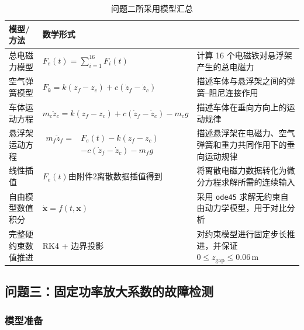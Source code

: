 \documentclass[a4paper]{nmmcm}
\begin{document}
\FloatBarrier
\begin{table}[H]
\centering
\caption{问题二所采用模型汇总}
\label{tab:problem2_model}
\small
\renewcommand{\arraystretch}{1.35}
\begin{tabularx}{\textwidth}{
>{\centering\arraybackslash}p{2.5cm}
>{\centering\arraybackslash}p{6.0cm}
>{\raggedright\arraybackslash}X}
\toprule
模型/方法 & 数学形式 & \multicolumn{1}{c}{用途说明} \\
\midrule

总电磁力模型 
& $F_e(t)=\sum_{i=1}^{16}F_i(t)$ 
& 计算 16 个电磁铁对悬浮架产生的总电磁力 \\

空气弹簧模型 
& $F_k=k(z_f-z_c)+c(\dot{z}_f-\dot{z}_c)$ 
& 描述车体与悬浮架之间的弹簧--阻尼连接作用 \\

车体运动方程 
& $m_c\ddot{z}_c=k(z_f-z_c)+c(\dot{z}_f-\dot{z}_c)-m_cg$ 
& 描述车体在垂向方向上的运动规律 \\

悬浮架运动方程 
& $\begin{aligned}
m_f\ddot{z}_f={}&F_e(t)-k(z_f-z_c)\\
&-c(\dot{z}_f-\dot{z}_c)-m_fg
\end{aligned}$ 
& 描述悬浮架在电磁力、空气弹簧和重力共同作用下的垂向运动规律 \\

线性插值 
& $F_e(t)\text{由附件2离散数据插值得到}$ 
& 将离散电磁力数据转化为微分方程求解所需的连续输入 \\

自由模型数值积分
& $\dot{\mathbf{x}}=f(t,\mathbf{x})$
& 采用 \texttt{ode45} 求解无约束自由动力学模型，用于对比分析 \\

完整硬约束数值推进
& RK4 + 边界投影
& 对约束模型进行固定步长推进，并保证 $0\leq z_{\mathrm{gap}}\leq0.06\,\mathrm{m}$ \\

\bottomrule
\end{tabularx}
\end{table}
\FloatBarrier

\subsection{问题三：固定功率放大系数的故障检测}

\subsubsection{模型准备}
\end{document}
